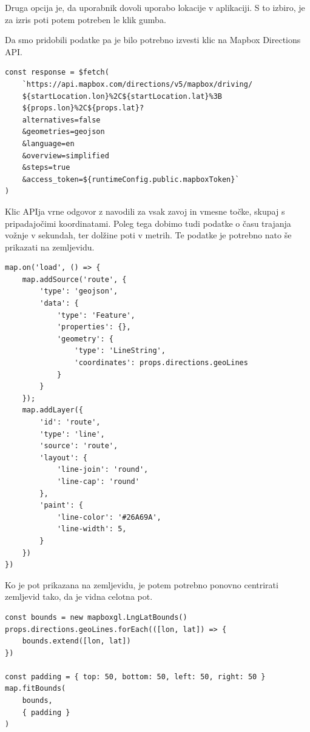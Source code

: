 \documentclass[a4paper,12pt,openright]{book}
\begin{document}
Druga opcija je, da uporabnik dovoli uporabo lokacije v aplikaciji.
S to izbiro, je za izris poti potem potreben le klik gumba.

Da smo pridobili podatke pa je bilo potrebno izvesti klic na Mapbox Directions API.
\begin{lstlisting}[label=code5,caption=URL za klic Mapbox Directions APIja\, ki vrne navodila za pot v formatu GeoJSON.,frame=tb,captionpos=b]
const response = $fetch(
    `https://api.mapbox.com/directions/v5/mapbox/driving/
    ${startLocation.lon}%2C${startLocation.lat}%3B
    ${props.lon}%2C${props.lat}?
    alternatives=false
    &geometries=geojson
    &language=en
    &overview=simplified
    &steps=true
    &access_token=${runtimeConfig.public.mapboxToken}`
)
\end{lstlisting}

Klic APIja vrne odgovor z navodili za vsak zavoj in vmesne točke, skupaj s pripadajočimi koordinatami.
Poleg tega dobimo tudi podatke o času trajanja vožnje v sekundah, ter dolžine poti v metrih.
Te podatke je potrebno nato še prikazati na zemljevidu.
\begin{lstlisting}[label=code6,caption=Izvorna koda za prikaz poti na zemljevidu.,frame=tb,captionpos=b]
map.on('load', () => {
    map.addSource('route', {
        'type': 'geojson',
        'data': {
            'type': 'Feature',
            'properties': {},
            'geometry': {
                'type': 'LineString',
                'coordinates': props.directions.geoLines
            }
        }
    });
    map.addLayer({
        'id': 'route',
        'type': 'line',
        'source': 'route',
        'layout': {
            'line-join': 'round',
            'line-cap': 'round'
        },
        'paint': {
            'line-color': '#26A69A',
            'line-width': 5,
        }
    })
})
\end{lstlisting}

Ko je pot prikazana na zemljevidu, je potem potrebno ponovno centrirati zemljevid tako, da je vidna celotna pot.
\begin{lstlisting}[label=code7,caption=Prilagoditev središča zemljevida in stopnje povečave\, da ustreza geografskemu območju poti.,frame=tb,captionpos=b]
const bounds = new mapboxgl.LngLatBounds()
props.directions.geoLines.forEach(([lon, lat]) => {
    bounds.extend([lon, lat])
})

const padding = { top: 50, bottom: 50, left: 50, right: 50 }
map.fitBounds(
    bounds,
    { padding }
)
\end{lstlisting}
\end{document}

